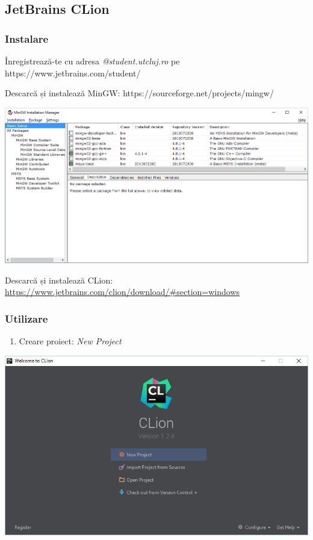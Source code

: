 \documentclass[../ro-fa-lab.tex]{subfiles}
\begin{document}
\subsection{JetBrains CLion}\label{jetbrains-clion}

\subsubsection{Instalare}\label{instalare-1}

Înregistrează-te cu adresa \emph{@student.utcluj.ro} pe
https://www.jetbrains.com/student/

Descarcă și instalează MinGW: https://sourceforge.net/projects/mingw/

\includegraphics[width=\textwidth]{../Resources/lab0/image7.png}

Descarcă și instalează CLion:
\url{https://www.jetbrains.com/clion/download/\#section=windows}

\subsubsection{Utilizare}\label{utilizare-1}

\begin{enumerate}
\def\labelenumi{\arabic{enumi}.}
\item
  Creare proiect: \emph{New Project}
\end{enumerate}

\includegraphics[width=\textwidth]{../Resources/lab0/image8.png}
\end{document}
